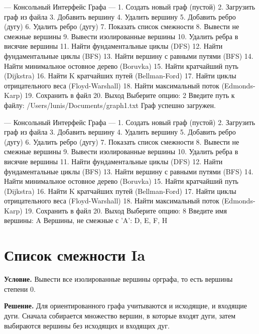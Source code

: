 \documentclass[pract]{SCWorks}
\begin{document}
    \begin{plaincode}
--- Консольный Интерфейс Графа ---
1. Создать новый граф (пустой)
2. Загрузить граф из файла
3. Добавить вершину
4. Удалить вершину
5. Добавить ребро (дугу)
6. Удалить ребро (дугу)
7. Показать список смежности
8. Вывести не смежные вершины
9. Вывести изолированные вершины
10. Удалить ребра в висячие вершины
11. Найти фундаментальные циклы (DFS)
12. Найти фундаментальные циклы (BFS)
13. Найти вершину с равными путями (BFS)
14. Найти минимальное остовное дерево (Boruvka)
15. Найти кратчайший путь (Dijkstra)
16. Найти K кратчайших путей (Bellman-Ford)
17. Найти циклы отрицательного веса (Floyd-Warshall)
18. Найти максимальный поток (Edmonds-Karp)
19. Сохранить в файл
20. Выход
Выберите опцию: 2
Введите путь к файлу: /Users/lunis/Documents/graph1.txt
Граф успешно загружен.

--- Консольный Интерфейс Графа ---
1. Создать новый граф (пустой)
2. Загрузить граф из файла
3. Добавить вершину
4. Удалить вершину
5. Добавить ребро (дугу)
6. Удалить ребро (дугу)
7. Показать список смежности
8. Вывести не смежные вершины
9. Вывести изолированные вершины
10. Удалить ребра в висячие вершины
11. Найти фундаментальные циклы (DFS)
12. Найти фундаментальные циклы (BFS)
13. Найти вершину с равными путями (BFS)
14. Найти минимальное остовное дерево (Boruvka)
15. Найти кратчайший путь (Dijkstra)
16. Найти K кратчайших путей (Bellman-Ford)
17. Найти циклы отрицательного веса (Floyd-Warshall)
18. Найти максимальный поток (Edmonds-Karp)
19. Сохранить в файл
20. Выход
Выберите опцию: 8
Введите имя вершины: A
Вершины, не смежные с 'A': D, E, F, H
    \end{plaincode}

    \section{Список смежности Ia}

    \textbf{Условие.}
    Вывести все изолированные вершины орграфа, то есть вершины степени 0.

    \textbf{Решение.}
    Для ориентированного графа учитываются и исходящие, и входящие дуги.
    Сначала собирается множество вершин, в которые входят дуги, затем выбираются вершины без исходящих и входящих дуг.
\end{document}
